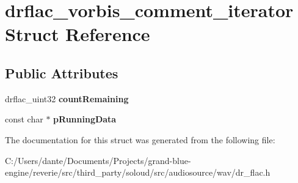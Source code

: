 \hypertarget{structdrflac__vorbis__comment__iterator}{}\section{drflac\+\_\+vorbis\+\_\+comment\+\_\+iterator Struct Reference}
\label{structdrflac__vorbis__comment__iterator}
\subsection*{Public Attributes}
\begin{DoxyCompactItemize}
\item 
\mbox{\label{structdrflac__vorbis__comment__iterator_a26b95bb53198ca11ef766cf33feea380}} 
drflac\+\_\+uint32 {\bfseries count\+Remaining}
\item 
\mbox{\label{structdrflac__vorbis__comment__iterator_abd461d820b3dad5f2e058915d3f04fbe}} 
const char $\ast$ {\bfseries p\+Running\+Data}
\end{DoxyCompactItemize}


The documentation for this struct was generated from the following file\+:\begin{DoxyCompactItemize}
\item 
C\+:/\+Users/dante/\+Documents/\+Projects/grand-\/blue-\/engine/reverie/src/third\+\_\+party/soloud/src/audiosource/wav/dr\+\_\+flac.\+h\end{DoxyCompactItemize}
